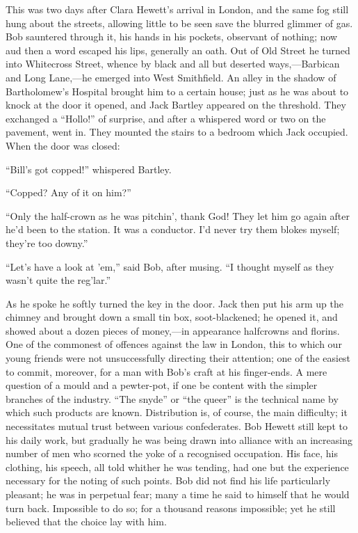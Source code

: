 This was two days after Clara Hewett's arrival in London, and the same
fog still hung about the streets, allowing little to be seen save the
blurred glimmer of gas. Bob sauntered through it, his hands in his
pockets, observant of nothing; now aud then a word escaped his lips,
generally an oath. Out of Old Street he turned into Whitecross Street,
whence by black and all but deserted ways,---Barbican and Long
Lane,---he emerged into West Smithfield. An alley in the shadow of
Bartholomew's Hospital brought him to a certain house; just as he was
about to knock {}at the door it opened, and Jack Bartley appeared on the
threshold. They exchanged a ``Hollo!'' of surprise, and after a
whispered word or two on the pavement, went in. They mounted the stairs
to a bedroom which Jack occupied. When the door was closed:

``Bill's got copped!'' whispered Bartley.

``Copped? Any of it on him?''

``Only the half-crown as he was pitchin', thank God! They let him go
again after he'd been to the station. It was a conductor. I'd never try
them blokes myself; they're too downy.''

``Let's have a look at 'em,'' said Bob, after musing. ``I thought myself
as they wasn't quite the reg'lar.''

As he spoke he softly turned the key in the door. Jack then put his arm
up the chimney and brought down a small tin box, soot-blackened; he
opened it, and showed about a dozen pieces of money,---in appearance
halfcrowns and florins. One of the commonest of offences against the law
in London, this to which our young friends were not unsuccessfully
directing their attention; one of the easiest to commit, moreover, for a
man with {}Bob's craft at his finger-ends. A mere question of a mould
and a pewter-pot, if one be content with the simpler branches of the
industry. ``The snyde'' or ``the queer'' is the technical name by which
such products are known. Distribution is, of course, the main
difficulty; it necessitates mutual trust between various confederates.
Bob Hewett still kept to his daily work, but gradually he was being
drawn into alliance with an increasing number of men who scorned the
yoke of a recognised occupation. His face, his clothing, his speech, all
told whither he was tending, had one but the experience necessary for
the noting of such points. Bob did not find his life particularly
pleasant; he was in perpetual fear; many a time he said to himself that
he would turn back. Impossible to do so; for a thousand reasons
impossible; yet he still believed that the choice lay with him.

